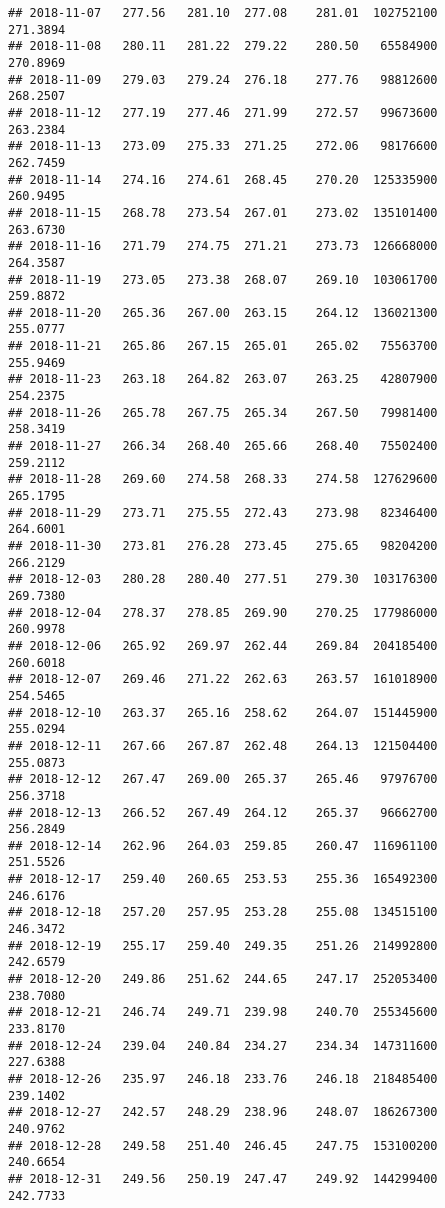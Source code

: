 \documentclass[
]{article}
\begin{document}
\begin{verbatim}
## 2018-11-07   277.56   281.10  277.08    281.01  102752100     271.3894
## 2018-11-08   280.11   281.22  279.22    280.50   65584900     270.8969
## 2018-11-09   279.03   279.24  276.18    277.76   98812600     268.2507
## 2018-11-12   277.19   277.46  271.99    272.57   99673600     263.2384
## 2018-11-13   273.09   275.33  271.25    272.06   98176600     262.7459
## 2018-11-14   274.16   274.61  268.45    270.20  125335900     260.9495
## 2018-11-15   268.78   273.54  267.01    273.02  135101400     263.6730
## 2018-11-16   271.79   274.75  271.21    273.73  126668000     264.3587
## 2018-11-19   273.05   273.38  268.07    269.10  103061700     259.8872
## 2018-11-20   265.36   267.00  263.15    264.12  136021300     255.0777
## 2018-11-21   265.86   267.15  265.01    265.02   75563700     255.9469
## 2018-11-23   263.18   264.82  263.07    263.25   42807900     254.2375
## 2018-11-26   265.78   267.75  265.34    267.50   79981400     258.3419
## 2018-11-27   266.34   268.40  265.66    268.40   75502400     259.2112
## 2018-11-28   269.60   274.58  268.33    274.58  127629600     265.1795
## 2018-11-29   273.71   275.55  272.43    273.98   82346400     264.6001
## 2018-11-30   273.81   276.28  273.45    275.65   98204200     266.2129
## 2018-12-03   280.28   280.40  277.51    279.30  103176300     269.7380
## 2018-12-04   278.37   278.85  269.90    270.25  177986000     260.9978
## 2018-12-06   265.92   269.97  262.44    269.84  204185400     260.6018
## 2018-12-07   269.46   271.22  262.63    263.57  161018900     254.5465
## 2018-12-10   263.37   265.16  258.62    264.07  151445900     255.0294
## 2018-12-11   267.66   267.87  262.48    264.13  121504400     255.0873
## 2018-12-12   267.47   269.00  265.37    265.46   97976700     256.3718
## 2018-12-13   266.52   267.49  264.12    265.37   96662700     256.2849
## 2018-12-14   262.96   264.03  259.85    260.47  116961100     251.5526
## 2018-12-17   259.40   260.65  253.53    255.36  165492300     246.6176
## 2018-12-18   257.20   257.95  253.28    255.08  134515100     246.3472
## 2018-12-19   255.17   259.40  249.35    251.26  214992800     242.6579
## 2018-12-20   249.86   251.62  244.65    247.17  252053400     238.7080
## 2018-12-21   246.74   249.71  239.98    240.70  255345600     233.8170
## 2018-12-24   239.04   240.84  234.27    234.34  147311600     227.6388
## 2018-12-26   235.97   246.18  233.76    246.18  218485400     239.1402
## 2018-12-27   242.57   248.29  238.96    248.07  186267300     240.9762
## 2018-12-28   249.58   251.40  246.45    247.75  153100200     240.6654
## 2018-12-31   249.56   250.19  247.47    249.92  144299400     242.7733

\end{verbatim}
\end{document}
